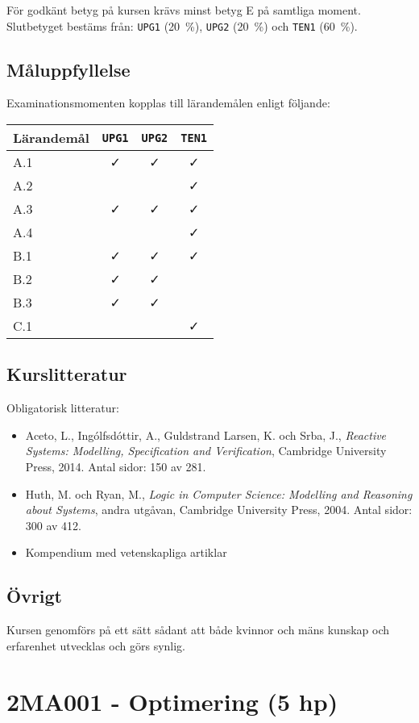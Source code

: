 För godkänt betyg på kursen krävs minst betyg E på samtliga moment.
Slutbetyget bestäms från: \texttt{UPG1} (20~\%), \texttt{UPG2} (20~\%) och \texttt{TEN1} (60~\%).

\subsection*{Måluppfyllelse}

Examinationsmomenten kopplas till lärandemålen enligt följande:

\begin{longtable}[]{@{}lccc@{}}
\toprule
\textsf{Lärandemål} & \texttt{UPG1} & \texttt{UPG2} & \texttt{TEN1}\tabularnewline
\midrule
\endhead
A.1 & \faCheck & \faCheck & \faCheck\tabularnewline
A.2 & & & \faCheck\tabularnewline
A.3 & \faCheck & \faCheck & \faCheck\tabularnewline
A.4 & & & \faCheck\tabularnewline
B.1 & \faCheck & \faCheck & \faCheck\tabularnewline
B.2 & \faCheck & \faCheck &\tabularnewline
B.3 & \faCheck & \faCheck &\tabularnewline
C.1 & & & \faCheck\tabularnewline
\bottomrule
\end{longtable}

\subsection*{Kurslitteratur}

Obligatorisk litteratur:

\begin{itemize}
\tightlist
\item
  Aceto, L., Ingólfsdóttir, A., Guldstrand Larsen, K. och Srba, J.,
  \emph{Reactive Systems: Modelling, Specification and Verification},
  Cambridge University Press, 2014. Antal sidor: 150 av 281.
\item
  Huth, M. och Ryan, M., \emph{Logic in Computer Science: Modelling and
  Reasoning about Systems}, andra utgåvan, Cambridge University Press,
  2004. Antal sidor: 300 av 412.
\item
  Kompendium med vetenskapliga artiklar
\end{itemize}

\subsection*{Övrigt}

Kursen genomförs på ett sätt sådant att både kvinnor och mäns kunskap och erfarenhet utvecklas och görs synlig.
\pagebreak
\section*{2MA001 - Optimering (5 hp)}

